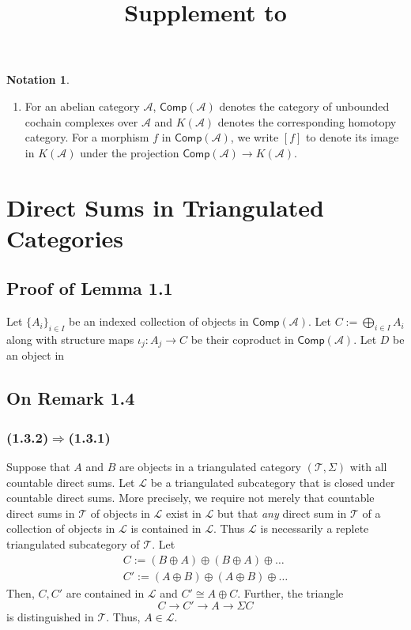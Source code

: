 \documentclass[oneside,11pt]{amsart}
\theoremstyle{definition}
\newtheorem{notn}[thm]{Notation}
\theoremstyle{remark}
\begin{document}
\title{Supplement to \cite{BN}}
\author{}
\date{\vspace{-1cm}}
\maketitle

\begin{notn}~
 \begin{enumerate}
  \item For an abelian category $\mathscr{A} $, $\textsf{Comp}(\mathscr{A} )$ denotes the category of unbounded cochain complexes over $\mathscr{A} $ and $K(\mathscr{A} )$ denotes the corresponding homotopy category. For a morphism $f$ in $\textsf{Comp}(\mathscr{A} )$, we write $[f]$ to denote its image in $K(\mathscr{A} )$ under the projection $\textsf{Comp}(\mathscr{A} ) \rightarrow K(\mathscr{A} )$.         
 \end{enumerate}
 
\end{notn}

\section{Direct Sums in Triangulated Categories}

\subsection*{Proof of Lemma 1.1}
Let $\{A_{i}\}_{i\in I}$ be an indexed collection of objects in $\textsf{Comp}(\mathscr{A})$. Let $C:=\bigoplus_{i\in I} A_{i}$ along with structure maps $\iota _{j}:A_{j} \rightarrow C$ be their coproduct in $\textsf{Comp}(\mathscr{A} )$. Let $D$ be an object in $ $     

\subsection*{On Remark 1.4} 
\subsubsection*{(1.3.2)$\Rightarrow $(1.3.1)}
  Suppose that $A$ and $B$ are objects in a triangulated category $(\mathscr{T}, \Sigma)$  with all countable direct sums. Let $\mathscr{L}  $ be a triangulated subcategory that is closed under countable direct sums. More precisely, we require not merely that countable direct sums in $\mathscr{T} $  of objects in $\mathscr{L} $ exist in $\mathscr{L} $ but that \emph{any} direct sum  in $\mathscr{T} $ of a collection of objects in $\mathscr{L} $ is contained in $\mathscr{L} $. Thus $\mathscr{L} $ is necessarily a replete triangulated subcategory of $\mathscr{T} $. Let 
\begin{align*}
 C:=(B\oplus A) \oplus (B\oplus A ) \oplus \ldots \\
C':= (A\oplus B)\oplus (A\oplus B)\oplus \ldots            
\end{align*}
Then, $C,C'$ are contained in $\mathscr{L} $ and $C'\cong A \oplus C$. Further, the triangle 
\begin{equation*}
 C \longrightarrow C' \longrightarrow A \longrightarrow \Sigma C
\end{equation*}
is distinguished in $\mathscr{T} $. Thus, $A\in \mathscr{L} $.
\end{document}
